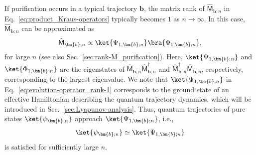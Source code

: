 \documentclass[preprint,pteplogo]{ptephy_v2}%
\numberwithin{equation}{section}
\theoremstyle{definition}
\begin{document}
If purification occurs in a typical trajectory $\bm{b}$, the matrix rank of $\hat{\mathsf{M}}_{\bm{b};n}$ in Eq.~\eqref{eq:product_Kraus-operators} typically becomes $1$ as $n\rightarrow\infty$. 
In this case, $\hat{\mathsf{M}}_{\bm{b};n}$ can be approximated as 
\begin{align}
    \hat{\mathsf{M}}_{\bm{b};n}\propto\ket{\Psi_{1,\bm{b};n}}\bra{\Phi_{1,\bm{b};n}},
    \label{eq:evolution-operator_rank-1}
\end{align}
for large $n$ (see also Sec.~\ref{sec:rank-M_purification}). 
Here, $\ket{\Psi_{1,\bm{b};n}}$ and $\ket{\Phi_{1,\bm{b};n}}$ are the eigenstates of $\hat{\mathsf{M}}_{\bm{b};n}\hat{\mathsf{M}}_{\bm{b};n}^\dagger$ and $\hat{\mathsf{M}}_{\bm{b};n}^\dagger\hat{\mathsf{M}}_{\bm{b};n}$, respectively, corresponding to the largest eigenvalue. 
We note that $\ket{\Psi_{1,\bm{b};n}}$ in Eq.~\eqref{eq:evolution-operator_rank-1} corresponds to the ground state of an effective Hamiltonian describing the quantum trajectory dynamics, which will be introduced in Sec.~\ref{sec:Lyapunov-analysis}.
Thus, quantum trajectories of pure states $\ket{\psi_{\bm{b};n}}$ approach $\ket{\Psi_{1,\bm{b};n}}$, i.e.,
\begin{align}
    \ket{\psi_{\bm{b};n}}\simeq\ket{\Psi_{1,\bm{b};n}}
\end{align}
is satisfied for sufficiently large $n$.
\end{document}
